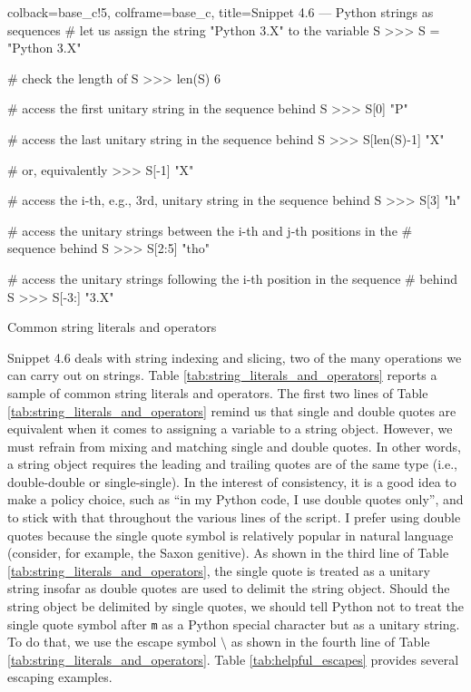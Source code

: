 \documentclass[a4paper,11pt]{book}
\numberwithin{figure}{chapter}
\numberwithin{table}{chapter}
\newcommand{\question}[1]{%
    \begin{tcolorbox}[colback=comp_c!10,colframe=comp_c,sidebyside align=top,width=\linewidth,before skip=1ex]
        #1
    \end{tcolorbox}
    \switchcolumn%
}
\newcommand{\note}[1]{%
    \begin{tcolorbox}[colback=white!0,colframe=white!10,width=\linewidth,before skip=1ex]
        #1
    \end{tcolorbox}
}
\begin{document}
\begin{pythoncode}[linenos=true,]{colback=base_c!5, colframe=base_c, title=\sffamily Snippet 4.6 --- Python strings as sequences}
# let us assign the string "Python 3.X" to the variable S
>>> S = "Python 3.X"

# check the length of S
>>> len(S)
6

# access the first unitary string in the sequence behind S 	
>>> S[0]
"P"

# access the last unitary string in the sequence behind S
>>> S[len(S)-1]
"X"

# or, equivalently
>>> S[-1]
"X"

# access the i-th, e.g., 3rd, unitary string in the sequence behind S
>>> S[3]
"h"

# access the unitary strings between the i-th and j-th positions in the 
# sequence behind S
>>> S[2:5]
"tho"

# access the unitary strings following the i-th position in the sequence 
# behind S
>>> S[-3:]
"3.X"

\end{pythoncode}
\clearpage

\begin{paracol}{2}
	\question{\raggedright Common string literals and operators}
	\note{Snippet 4.6 deals with string indexing and slicing, two of the many operations we can carry out on strings. Table \ref{tab:string_literals_and_operators} reports a sample of common string literals and operators. The first two lines of Table \ref{tab:string_literals_and_operators} remind us that single and double quotes are equivalent when it comes to assigning a variable to a string object. However, we must refrain from mixing and matching single and double quotes. In other words, a string object requires the leading and trailing quotes are of the same type (i.e., double-double or single-single). In the interest of consistency, it is a good idea to make a policy choice, such as ``in my Python code, I use double quotes only'', and to stick with that throughout the various lines of the script. I prefer using double quotes because the single quote symbol is relatively popular in natural language (consider, for example, the Saxon genitive). As shown in the third line of Table \ref{tab:string_literals_and_operators}, the single quote is treated as a unitary string insofar as double quotes are used to delimit the string object. Should the string object be delimited by single quotes, we should tell Python not to treat the single quote symbol after \texttt{m} as a Python special character but as a unitary string. To do that, we use the escape symbol $\setminus$  as shown in the fourth line of Table \ref{tab:string_literals_and_operators}. Table \ref{tab:helpful_escapes} provides several escaping examples.}
\end{paracol}
\clearpage
\end{document}
